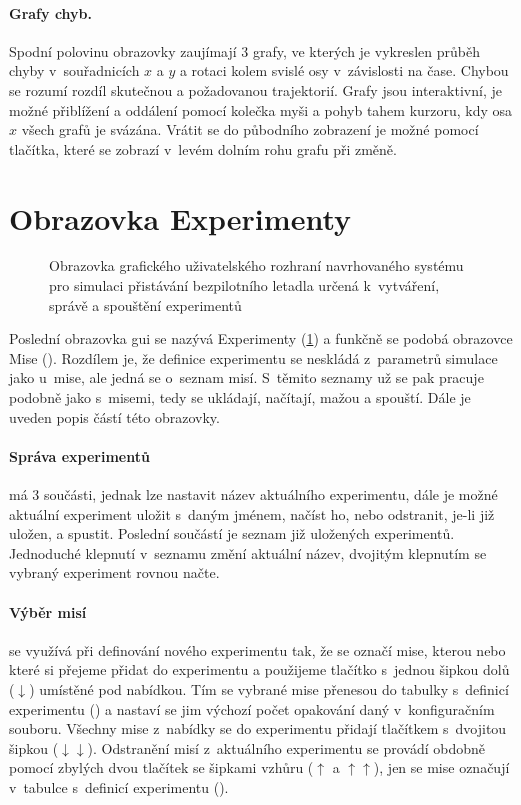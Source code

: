         \paragraph{ Grafy chyb.} Spodní polovinu obrazovky zaujímají 3 grafy, ve kterých je vykreslen průběh chyby v~souřadnicích $x$ a $y$ a rotaci kolem svislé osy v~závislosti na čase. Chybou se rozumí rozdíl skutečnou a požadovanou trajektorií. Grafy jsou interaktivní, je možné přiblížení a oddálení pomocí kolečka myši a pohyb tahem kurzoru, kdy osa $x$ všech grafů je svázána. Vrátit se do půbodního zobrazení je možné pomocí tlačítka, které se zobrazí v~levém dolním rohu grafu při změně.
    \section{Obrazovka Experimenty} \label{sec:experimenty}
        \begin{figure}
            \centering
            
            \caption[GUI: Obrazovka ]{Obrazovka  grafického uživatelského rozhraní navrhovaného systému pro simulaci přistávání bezpilotního letadla určená k~vytváření, správě a spouštění experimentů}
            \label{fig:tabExperimenty}
        \end{figure}
        Poslední obrazovka \acrshort{gui} se nazývá Experimenty (\cref{fig:tabExperimenty}) a funkčně se podobá obrazovce Mise (). Rozdílem je, že definice experimentu se neskládá z~parametrů simulace jako u~mise, ale jedná se o~seznam misí. S~těmito seznamy už se pak pracuje podobně jako s~misemi, tedy se ukládají, načítají, mažou a spouští. Dále je uveden popis částí této obrazovky.
        \paragraph{ Správa experimentů} má 3 součásti, jednak lze nastavit název aktuálního experimentu, dále je možné aktuální experiment uložit s~daným jménem, načíst ho, nebo odstranit, je-li již uložen, a spustit. Poslední součástí je seznam již uložených experimentů. Jednoduché klepnutí v~seznamu změní aktuální název, dvojitým klepnutím se vybraný experiment rovnou načte.

        \paragraph{ Výběr misí} se využívá při definování nového experimentu tak, že se označí mise, kterou nebo které si přejeme přidat do experimentu a použijeme tlačítko s~jednou šipkou dolů ($\downarrow$) umístěné pod nabídkou. Tím se vybrané mise přenesou do tabulky s~definicí experimentu () a nastaví se jim výchozí počet opakování daný v~konfiguračním souboru. Všechny mise z~nabídky se do experimentu přidají tlačítkem s~dvojitou šipkou ($\downarrow\downarrow$). Odstranění misí z~aktuálního experimentu se provádí obdobně pomocí zbylých dvou tlačítek se šipkami vzhůru ($\uparrow$ a $\uparrow\uparrow$), jen se mise označují v~tabulce s~definicí experimentu ().

